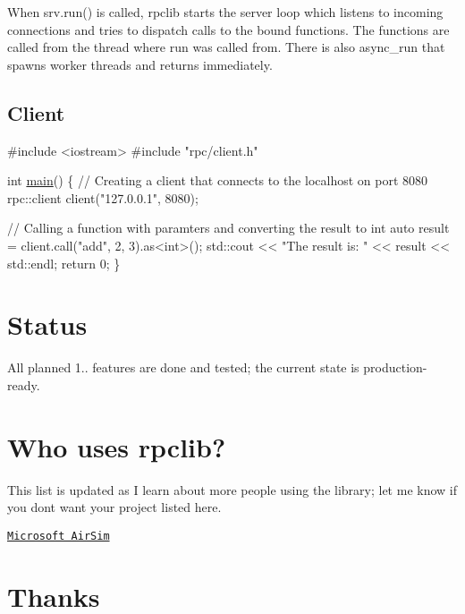When {\ttfamily srv.\+run()} is called, {\ttfamily rpclib} starts the server loop which listens to incoming connections and tries to dispatch calls to the bound functions. The functions are called from the thread where {\ttfamily run} was called from. There is also {\ttfamily async\+\_\+run} that spawns worker threads and returns immediately.

\subsection*{Client}


\begin{DoxyCode}
\textcolor{preprocessor}{#include <iostream>}
\textcolor{preprocessor}{#include "rpc/client.h"}

\textcolor{keywordtype}{int} \hyperlink{main_8cpp_ae66f6b31b5ad750f1fe042a706a4e3d4}{main}() \{
    \textcolor{comment}{// Creating a client that connects to the localhost on port 8080}
    rpc::client client(\textcolor{stringliteral}{"127.0.0.1"}, 8080);

    \textcolor{comment}{// Calling a function with paramters and converting the result to int}
    \textcolor{keyword}{auto} result = client.call(\textcolor{stringliteral}{"add"}, 2, 3).as<\textcolor{keywordtype}{int}>();
    std::cout << \textcolor{stringliteral}{"The result is: "} << result << std::endl;
    \textcolor{keywordflow}{return} 0;
\}
\end{DoxyCode}


\section*{Status}

All planned 1.. features are done and tested; the current state is production-\/ready.

\section*{Who uses rpclib?}

This list is updated as I learn about more people using the library; let me know if you don\textquotesingle{}t want your project listed here.


\begin{DoxyItemize}
\item \href{https://github.com/Microsoft/AirSim}{\tt Microsoft Air\+Sim}
\end{DoxyItemize}

\section*{Thanks}

